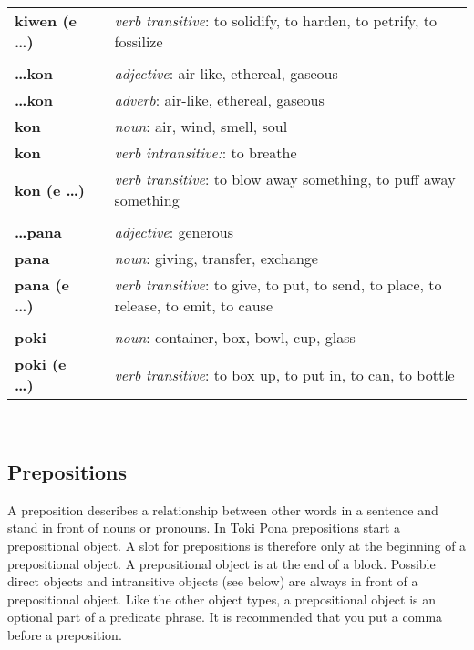 \begin{supertabular}{p{2,5cm}|ll}
\textbf{kiwen (e \dots)} && \textit{verb transitive}: to solidify, to harden, to petrify, to fossilize \\ %
 && \\ %
\textbf{\dots kon} && \textit{adjective}: air-like, ethereal, gaseous \\ %
\textbf{\dots kon} && \textit{adverb}: air-like, ethereal, gaseous \\ %
\textbf{kon} && \textit{noun}: air, wind, smell, soul \\ %
\textbf{kon} && \textit{verb intransitive:}: to breathe \\ %
\textbf{kon (e \dots)} && \textit{verb transitive}: to blow away something, to puff away something \\ %
 && \\ %
\textbf{\dots pana} && \textit{adjective}: generous \\ %
\textbf{pana} && \textit{noun}: giving, transfer, exchange \\ %
\textbf{pana (e \dots)} && \textit{verb transitive}: to give, to put, to send, to place, to release, to emit, to cause \\ %
 && \\ %
\textbf{poki} && \textit{noun}: container, box, bowl, cup, glass \\ %
\textbf{poki (e \dots)} && \textit{verb transitive}: to box up, to put in, to can, to bottle \\ %
\end{supertabular} \\
%
\newpage
\subsection*{Prepositions}
%
A preposition describes a relationship between other words in a sentence and stand in front of nouns or pronouns. 
In Toki Pona prepositions start a prepositional object. 
A slot for prepositions is therefore only at the beginning of a prepositional object. 
A prepositional object is at the end of a block. 
Possible direct objects and intransitive objects (see below) are always in front of a prepositional object.
Like the other object types, a prepositional object is an optional part of a predicate phrase. 
It is recommended that you put a comma before a preposition.
%
